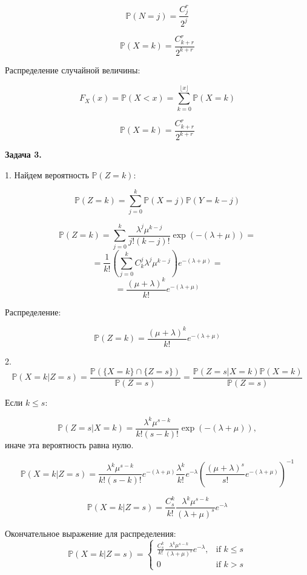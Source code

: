 \documentclass[12pt]{article}
\begin{document}
$$\mathbb{P}(N=j) = \frac{C_j^r}{2^j}$$

$$\mathbb{P}(X=k) = \frac{C_{k+r}^r}{2^{k+r}}$$

Распределение случайной величины:

$$F_X(x) = \mathbb{P}(X<x) = \sum\limits_{k = 0}^{\lfloor x \rfloor}\mathbb{P}(X=k)$$

$$\boxed{\mathbb{P}(X=k) = \frac{C_{k+r}^r}{2^{k+r}}}$$

\begin{center}
\textbf{Задача 3.}
\end{center}

1. Найдем вероятность $\mathbb{P}(Z = k)$:

$$\mathbb{P}(Z = k) = \sum\limits_{j=0}^k\mathbb{P}(X = j)\mathbb{P}(Y = k-j)$$

$$\mathbb{P}(Z=k) = \sum\limits_{j=0}^k\frac{\lambda^j\mu^{k-j}}{j!(k-j)!}\exp(-(\lambda+\mu)) =$$
$$=\frac{1}{k!}\left(\sum\limits_{j=0}^kC_k^j\lambda^j\mu^{k-j}\right)e^{-(\lambda+\mu)}=$$
$$=\frac{(\mu+\lambda)^k}{k!}e^{-(\lambda+\mu)}$$

Распределение:

$$\boxed{\mathbb{P}(Z=k)=\frac{(\mu+\lambda)^k}{k!}e^{-(\lambda+\mu)}}$$

2. $$\mathbb{P}(X=k|Z=s)= \frac{\mathbb{P}(\{X=k\}\cap\{Z=s\})}{\mathbb{P}(Z=s)} = \frac{\mathbb{P}(Z=s|X=k)\mathbb{P}(X=k)}{\mathbb{P}(Z=s)}$$

Если $k \leq s$:

$$\mathbb{P}(Z=s|X=k) = \frac{\lambda^k\mu^{s-k}}{k!(s-k)!}\exp(-(\lambda+\mu)),$$
иначе эта вероятность равна нулю.

$$\mathbb{P}(X=k|Z=s)= \frac{\lambda^k\mu^{s-k}}{k!(s-k)!}e^{-(\lambda+\mu)} \frac{\lambda^k}{k!}e^{-\lambda}\left(\frac{(\mu+\lambda)^s}{s!}e^{-(\lambda+\mu)}\right)^{-1}$$

$$\mathbb{P}(X=k|Z=s) = \frac{C_s^k}{k!}\frac{\lambda^k\mu^{s-k}}{(\lambda + \mu)^s} e^{-\lambda}$$

Окончательное выражение для распределения:
\begin{equation*}
\boxed{\mathbb{P}(X=k|Z=s)=
 \begin{cases}
   \frac{C_s^k}{k!}\frac{\lambda^k\mu^{s-k}}{(\lambda + \mu)^s} e^{-\lambda}, &\text{if  $k\leq s$}\\
   0 &\text{if $k>s$}
 \end{cases}}
\end{equation*}
\end{document}
